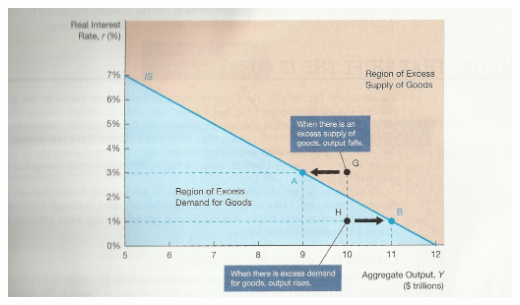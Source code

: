 \documentclass[12pt]{examnotes}
\begin{document}
\begin{center}
  \includegraphics[scale=0.5]{./imgs/c21f1.jpg}
\end{center}
\end{document}
